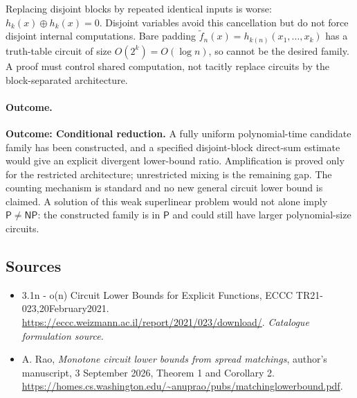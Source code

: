 \documentclass[11pt,a4paper]{article}
\numberwithin{equation}{section}
\begin{document}
Replacing disjoint blocks by repeated identical inputs is worse:
$h_k(x)\oplus h_k(x)=0$. Disjoint variables avoid this cancellation but do
not force disjoint internal computations. Bare padding
$\widetilde f_n(x)=h_{k(n)}(x_1,\ldots,x_k)$ has a truth-table circuit of
size $O(2^k)=O(\log n)$, so cannot be the desired family. A proof must
control shared computation, not tacitly replace circuits by the
block-separated architecture.

\paragraph{Outcome.}
\textbf{Outcome: Conditional reduction.}
A fully uniform polynomial-time candidate family has been constructed, and
a specified disjoint-block direct-sum estimate would give an explicit
divergent lower-bound ratio. Amplification is proved only for the restricted
architecture; unrestricted mixing is the remaining gap. The counting
mechanism is standard and no new general circuit lower bound is claimed.
A solution of this weak superlinear problem would not alone imply
$\mathsf P\ne\mathsf{NP}$: the constructed family is in $\mathsf P$ and
could still have larger polynomial-size circuits.

\subsection{Sources}
\begin{itemize}\raggedright
\item[\textnormal{[S1]}]\hypertarget{source:statement:1}{} 3.1n - o(n) Circuit Lower Bounds for Explicit Functions, ECCC TR21-023,20February2021.
\url{https://eccc.weizmann.ac.il/report/2021/023/download/}.
{\small\textit{Catalogue formulation source.}}
\item[\textnormal{[E1]}]\hypertarget{extra:statement:1}{} A. Rao,
\emph{Monotone circuit lower bounds from spread matchings}, author's
manuscript, 3 September 2026, Theorem 1 and Corollary 2.
\url{https://homes.cs.washington.edu/~anuprao/pubs/matchinglowerbound.pdf}.

\end{itemize}
\end{document}
